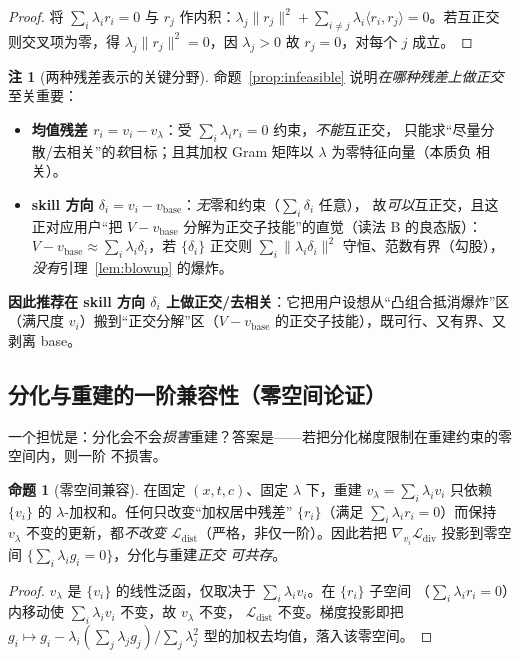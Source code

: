 \documentclass[11pt,a4paper]{article}
\newcommand{\loss}{\mathcal{L}}
\newcommand{\base}{\mathrm{base}}
\newcommand{\vbase}{v_{\base}}
\theoremstyle{definition}
\newtheorem{remark}{注}
\newtheorem{proposition}{命题}
\begin{document}
\begin{proof}
将 $\sum_i\lambda_i r_i=0$ 与 $r_j$ 作内积：$\lambda_j\|r_j\|^2+\sum_{i\neq j}\lambda_i\langle
r_i,r_j\rangle=0$。若互正交则交叉项为零，得 $\lambda_j\|r_j\|^2=0$，因 $\lambda_j>0$ 故
$r_j=0$，对每个 $j$ 成立。
\end{proof}

\begin{remark}[两种残差表示的关键分野]
\label{rem:two_resid}
命题~\ref{prop:infeasible} 说明\emph{在哪种残差上做正交}至关重要：
\begin{itemize}[leftmargin=1.5em]
\item \textbf{均值残差 $r_i=v_i-v_\lambda$}：受 $\sum_i\lambda_i r_i=0$ 约束，\emph{不能}互正交，
只能求``尽量分散/去相关''的\emph{软}目标；且其加权 Gram 矩阵以 $\lambda$ 为零特征向量（本质负
相关）。
\item \textbf{skill 方向 $\delta_i=v_i-\vbase$}：\emph{无}零和约束（$\sum_i\delta_i$ 任意），
故\emph{可以}互正交，且这正对应用户``把 $V-\vbase$ 分解为正交子技能''的直觉（读法 B 的良态版）：
$V-\vbase\approx\sum_i\lambda_i\delta_i$，若 $\{\delta_i\}$ 正交则 $\sum_i\|\lambda_i\delta_i\|^2$
守恒、范数有界（勾股），\emph{没有}引理~\ref{lem:blowup} 的爆炸。
\end{itemize}
\textbf{因此推荐在 skill 方向 $\delta_i$ 上做正交/去相关}：它把用户设想从``凸组合抵消爆炸''区
（满尺度 $v_i$）搬到``正交分解''区（$V-\vbase$ 的正交子技能），既可行、又有界、又剥离 base。
\end{remark}

\subsection{分化与重建的一阶兼容性（零空间论证）}
\label{ssec:compat}

一个担忧是：分化会不会\emph{损害}重建？答案是——若把分化梯度限制在重建约束的零空间内，则一阶
不损害。

\begin{proposition}[零空间兼容]
\label{prop:nullspace}
在固定 $(x,t,c)$、固定 $\lambda$ 下，重建 $v_\lambda=\sum_i\lambda_i v_i$ 只依赖 $\{v_i\}$ 的
$\lambda$-加权和。任何只改变``加权居中残差'' $\{r_i\}$（满足 $\sum_i\lambda_i r_i=0$）而保持
$v_\lambda$ 不变的更新，都\emph{不改变} $\loss_{\mathrm{dist}}$（严格，非仅一阶）。因此若把
$\nabla_{v_i}\loss_{\mathrm{div}}$ 投影到零空间 $\{\sum_i\lambda_i g_i=0\}$，分化与重建\emph{正交
可共存}。
\end{proposition}

\begin{proof}
$v_\lambda$ 是 $\{v_i\}$ 的线性泛函，仅取决于 $\sum_i\lambda_i v_i$。在 $\{r_i\}$ 子空间
（$\sum_i\lambda_i r_i=0$）内移动使 $\sum_i\lambda_i v_i$ 不变，故 $v_\lambda$ 不变，
$\loss_{\mathrm{dist}}$ 不变。梯度投影即把 $g_i\mapsto g_i-\lambda_i(\sum_j\lambda_j g_j)/
\sum_j\lambda_j^2$ 型的加权去均值，落入该零空间。
\end{proof}
\end{document}
